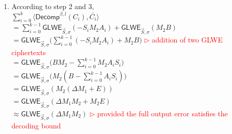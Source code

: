 \begin{myproof}
\begin{enumerate}
$ $
Therefore: \\
$\langle \textsf{Decomp}^{\beta, l}(A_0), \bar{C_0} \rangle + \langle \textsf{Decomp}^{\beta, l}(A_1), \bar{C_1} \rangle + \gap{$\cdots$} + \langle \textsf{Decomp}^{\beta, l}(A_{k-1}), \bar{C}_{k-1} \rangle$ \\
$= \sum\limits_{i=0}^{k-1}\langle \textsf{Decomp}^{\beta, l}(A_i), \bar{C_i} \rangle$ \\
$= \sum\limits_{i=0}^{k-1}\left(A_{\langle i, 1\rangle} \cdot \textsf{GLWE}_{\vec{S}, \sigma}\left(-S_iM_2\dfrac{q}{\beta^1}\right) + A_{\langle i, 2\rangle} \cdot \textsf{GLWE}_{\vec{S}, \sigma}\left(-S_iM_2\dfrac{q}{\beta^2}\right) + \gap{$\cdots$} + A_{\langle i, l\rangle} \cdot \textsf{GLWE}_{\vec{S}, \sigma}\left(-S_iM_2\dfrac{q}{\beta^l}\right)\right)$ \\
$= \sum\limits_{i=0}^{k-1}\left(\textsf{GLWE}_{\vec{S}, \sigma}\left(-A_{\langle i, 1\rangle}S_iM_2\dfrac{q}{\beta^1}\right) + \textsf{GLWE}_{\vec{S}, \sigma}\left(-A_{\langle i, 2\rangle}S_iM_2\dfrac{q}{\beta^2}\right) + \gap{$\cdots$} + \textsf{GLWE}_{\vec{S}, \sigma}\left(-A_{\langle i, l\rangle}S_iM_2\dfrac{q}{\beta^l}\right)\right)$ \\
$= \sum\limits_{i=0}^{k-1}\textsf{GLWE}_{\vec{S}, \sigma}\left(-A_{\langle i, 1\rangle}S_iM_2\dfrac{q}{\beta^1} + -A_{\langle i, 2\rangle}S_iM_2\dfrac{q}{\beta^2} + \gap{$\cdots$} + -A_{\langle i, l\rangle}S_iM_2\dfrac{q}{\beta^l}\right)$ \\
$= \sum\limits_{i=0}^{k-1}\textsf{GLWE}_{\vec{S}, \sigma}\left(-S_iM_2 \cdot \left(A_{\langle i, 1\rangle}\dfrac{q}{\beta^1} + A_{\langle i, 2\rangle}\dfrac{q}{\beta^2} + \gap{$\cdots$} + A_{\langle i, l\rangle}\dfrac{q}{\beta^l}\right)\right)$ \\
$= \sum\limits_{i=0}^{k-1}\textsf{GLWE}_{\vec{S}, \sigma}(-S_iM_2A_i)$
\item According to step 2 and 3, \\
$\sum\limits_{i=0}^{k}\langle \textsf{Decomp}^{\beta, l}(C_i), \bar{C_i} \rangle$ \\
$= \sum\limits_{i=0}^{k-1}\textsf{GLWE}_{\vec{S}, \sigma}(-S_iM_2A_i) + \textsf{GLWE}_{\vec{S}, \sigma} (M_{2}B)$ \\ 
$= \textsf{GLWE}_{\vec{S}, \sigma}\Big(\sum\limits_{i=0}^{k-1}(-S_iM_2A_i) + M_{2}B\Big)$ \textcolor{red}{ $\rhd$ addition of two GLWE ciphertexts} \\ 
$= \textsf{GLWE}_{\vec{S}, \sigma}\Big(BM_2 - \sum\limits_{i=0}^{k-1}M_2A_iS_i\Big)$  \\ 
$= \textsf{GLWE}_{\vec{S}, \sigma}\Big(M_2(B - \sum\limits_{i=0}^{k-1}A_iS_i)\Big)$\\
$= \textsf{GLWE}_{\vec{S}, \sigma}(M_2(\Delta M_1 + E))$ \\
$= \textsf{GLWE}_{\vec{S}, \sigma}(\Delta M_1M_2 + M_2E)$ \\
$\approx \textsf{GLWE}_{\vec{S}, \sigma}(\Delta M_1M_2)$ \textcolor{red}{ $\rhd$ provided the full output error satisfies the decoding bound}
\end{enumerate}

\end{myproof}

